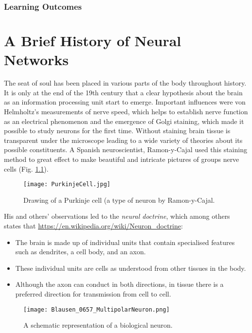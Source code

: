 \subsection{Learning Outcomes}

\chapter{A Brief History of Neural Networks}

The seat of soul has been placed in various parts of the body throughout history. It is only at the end of the 19th century
that a clear hypothesis about the brain as an information processing unit start to emerge. Important influences were
von Helmholtz's measurements of nerve speed, which helps to establish nerve function as an electrical phenomenon and
the emergence of Golgi staining, which made it possible to study neurons for the first time. Without staining brain tissue
is transparent under the microscope leading to a wide variety of theories about its possible constituents. A Spanish neuroscientist,
Ramon-y-Cajal used this staining method to great effect to make beautiful and intricate pictures of groups nerve cells (Fig. \ref{fig-draw}).

\begin{figure}[!ht]
  \begin{center}
    \texttt{[image: PurkinjeCell.jpg]}
  \end{center}
  \caption{Drawing of a Purkinje cell (a type of neuron by Ramon-y-Cajal.}
  \label{fig-draw}
\end{figure}

His and others' observations led to the \emph{neural doctrine}, which among others states that \url{https://en.wikipedia.org/wiki/Neuron_doctrine}:
\begin{itemize}
\item The brain is made up of individual units that contain specialised features such as dendrites, a cell body, and an axon.

\item These individual units are cells as understood from other tissues in the body.

\item Although the axon can conduct in both directions, in tissue there is a preferred direction for transmission from cell to cell.

\end{itemize}

\begin{figure}[!ht]
  \begin{center}
    \texttt{[image: Blausen\_0657\_MultipolarNeuron.png]}
   \end{center}
  \caption{A schematic representation of a biological neuron.}
  \label{fig-biological}
\end{figure}


